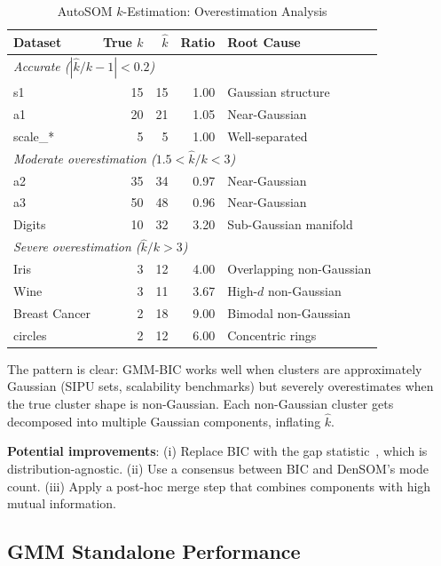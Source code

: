 \documentclass[journal]{IEEEtran}
\begin{document}
\begin{table}[!t]
\caption{AutoSOM $k$-Estimation: Overestimation Analysis}
\label{tab:autosom_k}
\centering
\renewcommand{\arraystretch}{1.1}
\small
\begin{tabular}{lrrrl}
\toprule
Dataset & True $k$ & $\hat{k}$ & Ratio & Root Cause \\
\midrule
\multicolumn{5}{l}{\textit{Accurate ($|\hat{k}/k - 1| < 0.2$)}} \\
s1 & 15 & 15 & 1.00 & Gaussian structure \\
a1 & 20 & 21 & 1.05 & Near-Gaussian \\
scale\_* & 5 & 5 & 1.00 & Well-separated \\
\midrule
\multicolumn{5}{l}{\textit{Moderate overestimation ($1.5 < \hat{k}/k < 3$)}} \\
a2 & 35 & 34 & 0.97 & Near-Gaussian \\
a3 & 50 & 48 & 0.96 & Near-Gaussian \\
Digits & 10 & 32 & 3.20 & Sub-Gaussian manifold \\
\midrule
\multicolumn{5}{l}{\textit{Severe overestimation ($\hat{k}/k > 3$)}} \\
Iris & 3 & 12 & 4.00 & Overlapping non-Gaussian \\
Wine & 3 & 11 & 3.67 & High-$d$ non-Gaussian \\
Breast Cancer & 2 & 18 & 9.00 & Bimodal non-Gaussian \\
circles & 2 & 12 & 6.00 & Concentric rings \\
\bottomrule
\end{tabular}
\end{table}

The pattern is clear: GMM-BIC works well when clusters are approximately Gaussian (SIPU sets, scalability benchmarks) but severely overestimates when the true cluster shape is non-Gaussian. Each non-Gaussian cluster gets decomposed into multiple Gaussian components, inflating $\hat{k}$.

\textbf{Potential improvements}: (i) Replace BIC with the gap statistic~\cite{tibshirani2001estimating}, which is distribution-agnostic. (ii) Use a consensus between BIC and DenSOM's mode count. (iii) Apply a post-hoc merge step that combines components with high mutual information.

\subsection{GMM Standalone Performance}
\end{document}
